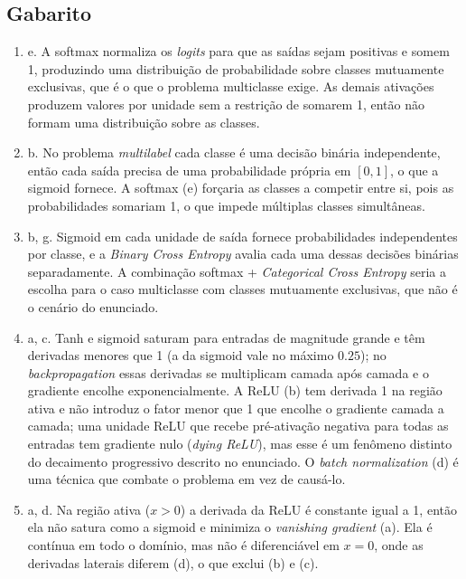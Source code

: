 \documentclass{dlproblemset}
\begin{document}
\subsection*{Gabarito}
\color{blue}
\begin{enumerate}[1)]

    \item e. A softmax normaliza os \textit{logits} para que as saídas sejam positivas e somem 1, produzindo uma distribuição de probabilidade sobre classes mutuamente exclusivas, que é o que o problema multiclasse exige. As demais ativações produzem valores por unidade sem a restrição de somarem 1, então não formam uma distribuição sobre as classes.

    \item b. No problema \textit{multilabel} cada classe é uma decisão binária independente, então cada saída precisa de uma probabilidade própria em $[0,1]$, o que a sigmoid fornece. A softmax (e) forçaria as classes a competir entre si, pois as probabilidades somariam 1, o que impede múltiplas classes simultâneas.

    \item b, g. Sigmoid em cada unidade de saída fornece probabilidades independentes por classe, e a \textit{Binary Cross Entropy} avalia cada uma dessas decisões binárias separadamente. A combinação softmax + \textit{Categorical Cross Entropy} seria a escolha para o caso multiclasse com classes mutuamente exclusivas, que não é o cenário do enunciado.

    \item a, c. Tanh e sigmoid saturam para entradas de magnitude grande e têm derivadas menores que 1 (a da sigmoid vale no máximo $0.25$); no \textit{backpropagation} essas derivadas se multiplicam camada após camada e o gradiente encolhe exponencialmente. A ReLU (b) tem derivada 1 na região ativa e não introduz o fator menor que 1 que encolhe o gradiente camada a camada; uma unidade ReLU que recebe pré-ativação negativa para todas as entradas tem gradiente nulo (\textit{dying ReLU}), mas esse é um fenômeno distinto do decaimento progressivo descrito no enunciado. O \textit{batch normalization} (d) é uma técnica que combate o problema em vez de causá-lo.

    \item a, d. Na região ativa ($x>0$) a derivada da ReLU é constante igual a 1, então ela não satura como a sigmoid e minimiza o \textit{vanishing gradient} (a). Ela é contínua em todo o domínio, mas não é diferenciável em $x=0$, onde as derivadas laterais diferem (d), o que exclui (b) e (c).


\end{enumerate}
\end{document}
